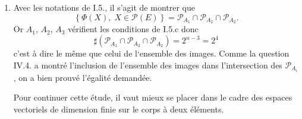 \begin{enumerate}
\item Avec les notations de I.5., il s'agit de montrer que 
\begin{displaymath}
 \left\lbrace \Phi(X),\;X \in \mathcal{P}(E)\right\rbrace = \mathcal P_{A_1} \cap \mathcal P_{A_2}\cap \mathcal P_{A_2}.
\end{displaymath}
Or $A_1$, $A_2$, $A_3$ vérifient les conditions de I.5.c donc 
\begin{displaymath}
 \sharp\left( \mathcal P_{A_1} \cap \mathcal P_{A_2}\cap \mathcal P_{A_2}\right) =  2^{n-3}=2^4
\end{displaymath}
c'est à dire le même que celui de l`ensemble des images. Comme la question IV.4. a montré l'inclusion de l'ensemble des images dans l'intersection des $\mathcal P_{A_i}$, on a bien prouvé l'égalité demandée.

Pour continuer cette étude, il vaut mieux se placer dans le cadre des espaces vectoriels de dimension finie sur le corps à deux éléments.
\end{enumerate}
